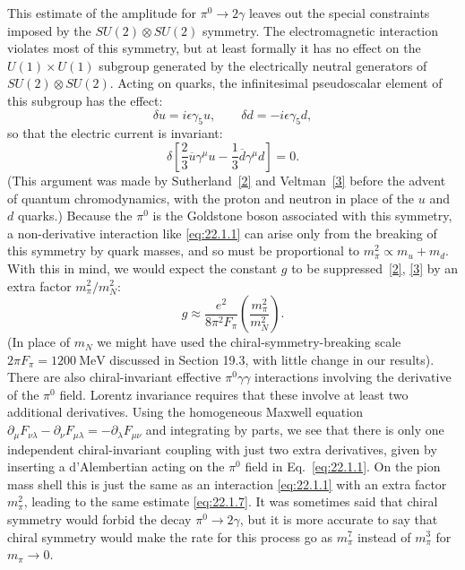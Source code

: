 This estimate of the amplitude for $\pi^0\to2\gamma$ leaves out the special
constraints imposed by the $SU(2)\otimes SU(2)$ symmetry. The electromagnetic
interaction violates most of this symmetry, but at least formally it has no
effect on the $U(1)\times U(1)$ subgroup generated by the electrically
neutral generators of $SU(2)\otimes SU(2)$. Acting on quarks, the
infinitesimal pseudoscalar element of this subgroup has the effect:
\begin{equation}
 \delta u=i\epsilon\gamma_5u,\qquad
 \delta d=-i\epsilon\gamma_5d,
 \tag{22.1.5}\label{eq:22.1.5}
\end{equation}
so that the electric current is invariant:
\begin{equation}
 \delta\left[
  \frac{2}{3}\overline u\gamma^\mu u
  -\frac{1}{3}\overline d\gamma^\mu d
 \right]=0.
 \tag{22.1.6}\label{eq:22.1.6}
\end{equation}
(This argument was made by Sutherland~\hyperref[ch22-ref-2]{[2]} and
Veltman~\hyperref[ch22-ref-3]{[3]} before the advent of quantum
chromodynamics, with the proton and neutron in place of the $u$ and $d$
quarks.) Because the $\pi^0$ is the Goldstone boson associated with this
symmetry, a non-derivative interaction like \eqref{eq:22.1.1} can arise only
from the breaking of this symmetry by quark masses, and so must be
proportional to $m_\pi^2\propto m_u+m_d$. With this in mind, we would expect
the constant $g$ to be suppressed~\hyperref[ch22-ref-2]{[2]},
\hyperref[ch22-ref-3]{[3]} by an extra factor $m_\pi^2/m_N^2$:
\begin{equation}
 g\approx\frac{e^2}{8\pi^2F_\pi}
 \left(\frac{m_\pi^2}{m_N^2}\right).
 \tag{22.1.7}\label{eq:22.1.7}
\end{equation}
(In place of $m_N$ we might have used the chiral-symmetry-breaking scale
$2\pi F_\pi=1200\ \mathrm{MeV}$ discussed in Section 19.3, with little
change in our results). There are also chiral-invariant effective
$\pi^0\gamma\gamma$ interactions involving the derivative of the $\pi^0$
field. Lorentz invariance requires that these involve at least two
additional derivatives. Using the homogeneous Maxwell equation
$\partial_\mu F_{\nu\lambda}-\partial_\nu F_{\mu\lambda}
=-\partial_\lambda F_{\mu\nu}$ and integrating by parts, we see that there
is only one independent chiral-invariant coupling with just two extra
derivatives, given by inserting a d'Alembertian acting on the $\pi^0$ field
in Eq.~\eqref{eq:22.1.1}. On the pion mass shell this is just the same as an
interaction \eqref{eq:22.1.1} with an extra factor $m_\pi^2$, leading to the
same estimate \eqref{eq:22.1.7}. It was sometimes said that chiral symmetry
would forbid the decay $\pi^0\to2\gamma$, but it is more accurate to say
that chiral symmetry would make the rate for this process go as $m_\pi^7$
instead of $m_\pi^3$ for $m_\pi\to0$.

